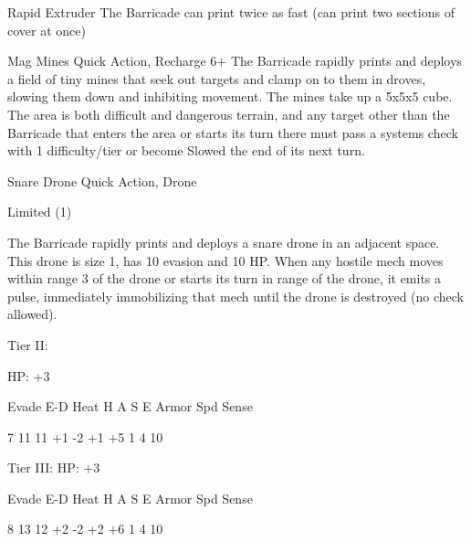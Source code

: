 Rapid Extruder  
The Barricade can print twice as fast (can print two sections of cover at once)
 

Mag Mines  
Quick Action, Recharge 6+  
The Barricade rapidly prints and deploys a field of tiny mines that seek out targets and clamp on  
to them in droves, slowing them down and inhibiting movement. The mines take up a 5x5x5  
cube. The area is both difficult and dangerous terrain, and any target other than the Barricade  
that enters the area or starts its turn there must pass a systems check with 1 difficulty/tier or  
become Slowed the end of its next turn.
 

Snare Drone  
Quick Action, Drone
 
Limited (1)
 
The Barricade rapidly prints and deploys a snare drone in an adjacent space. This drone is size  
1, has 10 evasion and 10 HP. When any hostile mech moves within range 3 of the drone or starts  
its turn in range of the drone, it emits a pulse, immediately immobilizing that mech until the drone  
is destroyed (no check allowed).
 

Tier II:
 
HP: +3	
 

          Evade     E-D    Heat    H    A     S     E       Armor        Spd       Sense 

          7         11     11      +1   -2    +1    +5      1            4         10 

Tier III:  
HP: +3
 

          Evade     E-D    Heat    H    A     S     E       Armor        Spd       Sense 

          8         13     12      +2   -2    +2    +6      1            4         10 
